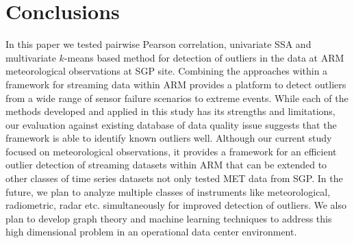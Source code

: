 \section{Conclusions}
In this paper we tested pairwise Pearson correlation,
univariate SSA and multivariate $k$-means based method for detection of
outliers in the data at ARM meteorological observations at SGP site. 
Combining the approaches within a framework for
streaming data within ARM provides a platform to detect outliers
from a wide range of sensor failure scenarios to extreme events.
While each of the methods developed and applied in this study has its
strengths and limitations, our evaluation against existing database of
data quality issue suggests that the framework is able to identify known
outliers well. Although our current study focused on
meteorological observations, it provides a framework for an efficient
outlier detection of streaming datasets within ARM that can be extended to
other classes of time series datasets not only tested MET data from SGP. 
In the future, we plan to analyze multiple
classes of instruments like meteorological, radiometric, radar etc.
simultaneously for improved detection of outliers. We also plan to
develop graph theory \cite{phillips2015graph} and machine learning techniques to address this
high dimensional problem in an operational data center environment.

